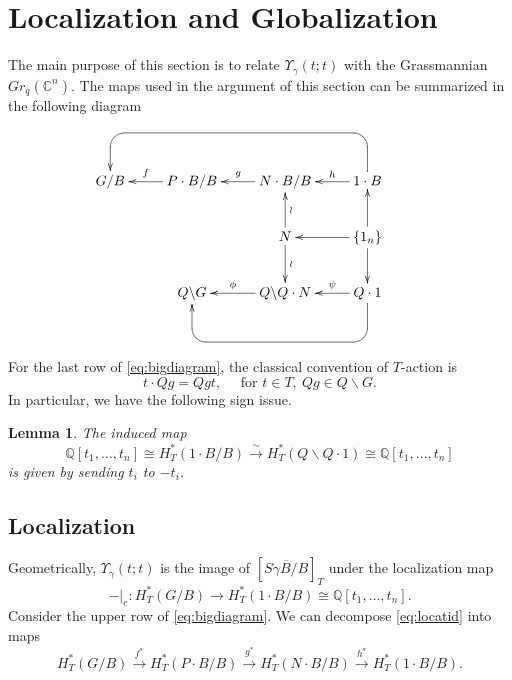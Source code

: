 \documentclass[12pt,reqno]{amsart}
\numberwithin{equation}{section}
\newtheorem{lemma}[theorem]{Lemma}
\theoremstyle{definition}
\begin{document}
\section{Localization and Globalization}\label{Localization and Globalization}

The main purpose of this section is to relate $\Upsilon_\gamma(t;t)$ with the Grassmannian $Gr_q(\mathbb{C}^n)$.
The maps used in the argument of this section can be summarized in the following diagram 
\begin{equation}\label{eq:bigdiagram}
\begin{matrix}\xymatrix{
&&&&\\
G/B & P\cdot B/B\ar[l]_-f & N\cdot B/B \ar[l]_-g & 1\cdot B\ar[l]_-h
\ar`u[ul]`[lll][lll]\\
 && N\ar[u]_-\wr\ar[d]^-\wr & \{1_n\}\ar[l]\ar[u]\ar[d]\\
& Q\backslash G & Q\backslash Q\cdot N \ar[l]_-\phi & Q\cdot 1\ar[l]_-\psi
\ar`d[d]`[dll][ll]\\
&&&&} 
\end{matrix}
\end{equation}
For the last row of \eqref{eq:bigdiagram}, the classical convention of $T$-action is 
$$t\cdot Qg=Qgt,\quad \text{ for $t\in T,\ Qg\in Q\backslash G$}.$$
In particular, we have the following sign issue. 

\begin{lemma}\label{lemma:diag1}
The induced map 
$$\mathbb{Q}[t_1,\ldots,t_n]\cong H_T^*(1\cdot B/B)
\stackrel{\sim}\longrightarrow 
H_T^*(Q\backslash Q\cdot 1)\cong \mathbb{Q}[t_1,\ldots,t_n]$$
is given by sending $t_i$ to $-t_i$. 
\end{lemma}


\subsection{Localization}
Geometrically, $\Upsilon_\gamma(t;t)$ is the image of $[\overline{S\dot{\gamma}B/B}]_T$ under the localization map 
\begin{equation}\label{eq:locatid}
-|_e:H_T^*(G/B)\longrightarrow H_T^*(1\cdot B/B)\cong \mathbb{Q}[t_1,\ldots,t_n]. 
\end{equation}
Consider the upper row of \eqref{eq:bigdiagram}. 
We can decompose \eqref{eq:locatid} into maps 
$$H_T^*(G/B)
\stackrel{f^*}\longrightarrow 
H_T^*(P\cdot B/B)
\stackrel{g^*}\longrightarrow 
H_T^*(N\cdot B/B)
\stackrel{h^*}\longrightarrow 
H_T^*(1\cdot B/B). $$
\end{document}
